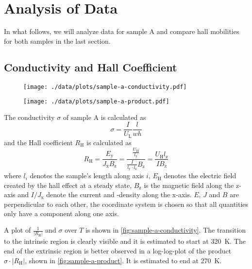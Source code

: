 \chapter{Analysis of Data}

In what follows, we will analyze data for sample A and compare hall mobilities for both samples in the last section.

\section{Conductivity and Hall Coefficient}
\begin{figure}
  \centering
  \texttt{[image: ./data/plots/sample-a-conductivity.pdf]}
  \label{fig:sample-a-conductivity}
\end{figure}

\begin{figure}
  \centering
  \texttt{[image: ./data/plots/sample-a-product.pdf]}
  \label{fig:sample-a-product}
\end{figure}

The conductivity $\sigma$ of sample A is calculated as
\begin{equation*}
	\sigma = \frac{I}{U_\text{L}} \frac{l}{w h}
\end{equation*}
and the Hall coefficient $R_\text{H}$ is calculated as
\begin{equation*}
	R_\text{H} = \frac{E_\text{y}}{J_\text{x} B_\text{z}} = \frac{\frac{U_\text{H}}{l_\text{y}}}{\frac{I}{l_\text{y} \cdot l_\text{z}} B_\text{z}} = \frac{U_\text{H} l_\text{z}}{I B_\text{z}}
\end{equation*}
where $l_i$ denotes the sample's length along axis $i$, $E_\text{H}$ denotes the electric field created by the hall effect at a steady state, $B_\text{z}$ is the magnetic field along the z-axis and $I / J_\text{x}$ denote the current and -density along the x-axis.
$E$, $J$ and $B$ are perpendicular to each other, the coordinate system is chosen so that all quantities only have a component along one axis.

A plot of $\frac{1}{\left|R_\text{H}\right|}$ and $\sigma$ over $T$ is shown in \autoref{fig:sample-a-conductivity}.
The transition to the intrinsic region is clearly visible and it is estimated to start at \SI{320}{\kelvin}.
The end of the extrinsic region is better observed in a log-log-plot of the product $\sigma \cdot \left| R_\text{H} \right|$, shown in \autoref{fig:sample-a-product}.
It is estimated to end at \SI{270}{\kelvin}.

